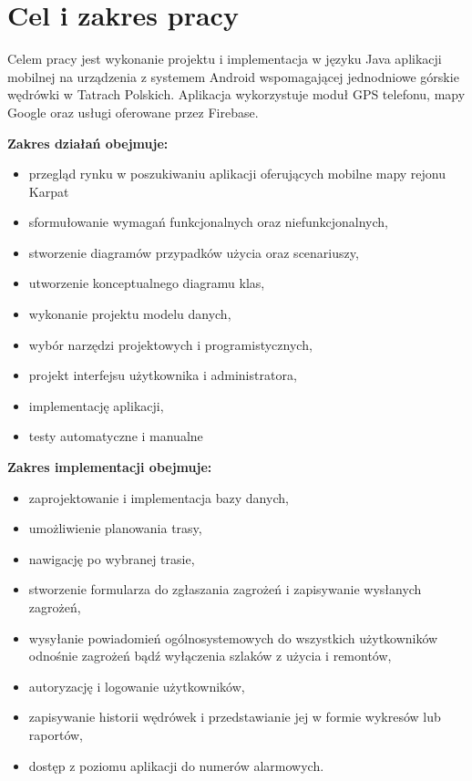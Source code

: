 \section{Cel i zakres pracy}

    Celem pracy jest wykonanie projektu i implementacja w języku Java aplikacji mobilnej na urządzenia z systemem Android wspomagającej jednodniowe górskie wędrówki w Tatrach Polskich. Aplikacja wykorzystuje moduł GPS telefonu, mapy Google oraz usługi oferowane przez Firebase.


    \vspace{0.5cm}
    
    \textbf{Zakres działań obejmuje:}
    \begin{itemize}
        \item przegląd rynku w poszukiwaniu aplikacji oferujących mobilne mapy rejonu Karpat
        \item sformułowanie wymagań funkcjonalnych oraz niefunkcjonalnych, 
        \item stworzenie diagramów przypadków użycia oraz scenariuszy,  
        \item utworzenie konceptualnego diagramu klas, 
        \item wykonanie projektu modelu danych,
        \item wybór narzędzi projektowych i programistycznych, 
        \item projekt interfejsu użytkownika i administratora,
        \item implementację aplikacji,
        \item testy automatyczne i manualne
    \end{itemize}
    \textbf{Zakres implementacji obejmuje:}
    \begin{itemize}
        \item zaprojektowanie i implementacja bazy danych,
        \item umożliwienie planowania trasy,
        \item nawigację po wybranej trasie,
        \item stworzenie formularza do zgłaszania zagrożeń i zapisywanie wysłanych zagrożeń,
        \item wysyłanie powiadomień ogólnosystemowych do wszystkich użytkowników odnośnie zagrożeń bądź wyłączenia szlaków z użycia i remontów,
        \item autoryzację i logowanie użytkowników,
        \item zapisywanie historii wędrówek i przedstawianie jej w formie wykresów lub raportów,
        \item dostęp z poziomu aplikacji do numerów alarmowych.
    \end{itemize}
